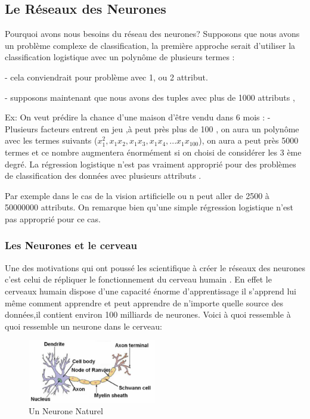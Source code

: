\subsection{Le Réseaux des Neurones }
Pourquoi avons nous besoins du réseau des neurones? 
Supposons que nous avons un problème complexe de classification, la première approche serait d'utiliser la classification logistique avec un polynôme de plusieurs termes :

- cela conviendrait pour problème avec 1, ou 2 attribut.

- supposons maintenant que nous avons des  tuples avec plus de 1000 attributs ,

Ex: On veut prédire la chance d'une maison d'être vendu dans 6 mois  :
- Plusieurs facteurs entrent en jeu ,à peut près plus de 100 , on aura un polynôme avec les termes suivants (${x}_{1}^{2},{x}_{1}{x}_{2},{x}_{1}{x}_{3},{x}_{1}{x}_{4},...{x}_{1}{x}_{100}$),
on aura a peut près 5000 termes et ce nombre augmentera énormément si on choisi de considérer les 3 ème degré.
La régression logistique n'est pas vraiment approprié pour des problèmes de classification des données avec plusieurs attributs .

Par exemple dans le cas de la vision artificielle ou n peut aller de 2500 à 50000000  attributs.
On remarque bien qu'une simple régression logistique n'est pas approprié pour ce cas.

\subsubsection{Les Neurones et le cerveau\cite{NNBook}}

Une des motivations qui ont poussé les scientifique à créer le réseaux des neurones c'est celui de répliquer le fonctionnement du cerveau humain .
En effet le cerveaux humain dispose d'une capacité énorme d'apprentissage il s'apprend lui même comment apprendre et peut apprendre de n'importe quelle source des données,il  contient environ 100 milliards de neurones.
Voici à quoi ressemble à quoi ressemble un neurone dans le cerveau:
\begin{figure}[ht]
	\centering
	\includegraphics[width=0.5\textwidth]{fig/Neurone.png}
	\caption{Un Neurone Naturel}
	\label{fig:image9}
\end{figure}

